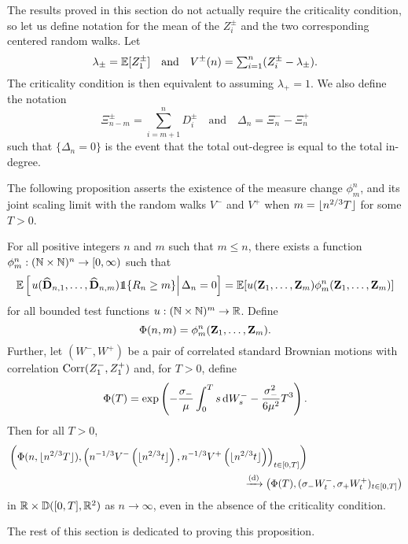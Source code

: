 The results proved in this section do not actually require the criticality condition, so let us define notation for the mean of the $Z_i^{\pm}$ and the two corresponding centered random walks. Let
\begin{equation*}
    \lambda_{\pm} = {\mathbb E}[Z^{\pm}_1]
    \quad \text{and} \quad
    V^{\pm}(n) = \textstyle \sum_{i=1}^n (Z^{\pm}_i - \lambda_{\pm}).
\end{equation*}
The criticality condition is then equivalent to assuming $\lambda_+ = 1$. We also define the notation
\begin{equation*}
    \Xi^{\pm}_{n-m} = \sum_{i=m+1}^n D_i^{\pm}
    \quad \text{and} \quad
    \Delta_n = \Xi^-_n - \Xi^+_n
\end{equation*}
such that $\{\Delta_n = 0\}$ is the event that the total out-degree is equal to the total in-degree.

The following proposition asserts the existence of the measure change $\phi^n_m$, and its joint scaling limit with the random walks $V^-$ and $V^+$ when $m = \lfloor n^{2/3} T\rfloor$ for some $T > 0$.
\begin{proposition}
    \label{prop:measure-change-no-crit}
    For all positive integers $n$ and $m$ such that $m \leq n$, there exists a function $\phi^n_m: ({\mathbb N} \times {\mathbb N})^n \to [0, \infty)$ such that 
    \begin{equation*}
        \E\left[\left.u(\mathbf{\widehat{D}}_{n, 1}, \ldots, \mathbf{\widehat{D}}_{n, m}) \one\{R_n \geq m\} \right| \Delta_n = 0\right]
        = \E[u(\vZ_1, \ldots, \vZ_m) \phi^n_m(\vZ_1, \ldots, \vZ_m)]
    \end{equation*}
    for all bounded test functions $u: ({\mathbb N} \times {\mathbb N})^m \to {\mathbb R}$. Define
    \begin{equation*}
        \Phi(n, m) = \phi^n_m({\mathbf Z}_1, \ldots, {\mathbf Z}_m).
    \end{equation*}
    Further, let $(W^-, W^+)$ be a pair of correlated standard Brownian motions with correlation $\operatorname{Corr}(Z_1^-, Z_1^+)$ and, for $T > 0$, define
    \begin{equation*}
        \Phi(T) = \exp\left( 
            - \frac{\sigma_-}{\mu} \int_0^T s \mathop{}\!\mathrm{d} W_s^- 
            - \frac{\sigma_-^2}{6 \mu^2} T^3
        \right).
    \end{equation*}
    Then for all $T > 0$,
    \begin{align*}
        &\left( 
            \Phi(n, \floor{n^{2/3} T}),
            \left(
                n^{-1/3} V^-\left( \floor{n^{2/3} t} \right),
                n^{-1/3} V^+\left( \floor{n^{2/3} t} \right)
            \right)_{t \in [0, T]}
        \right) \\
        & \hspace{23em} \todist \left( 
            \Phi(T),
            (\sigma_- W^-_t, \sigma_+ W^+_t)_{t \in [0, T]}
        \right)
    \end{align*}
    in ${\mathbb R} \times {\mathbb D}([0, T], {\mathbb R}^2)$ as $n \to \infty$, even in the absence of the criticality condition.
\end{proposition}
The rest of this section is dedicated to proving this proposition.

